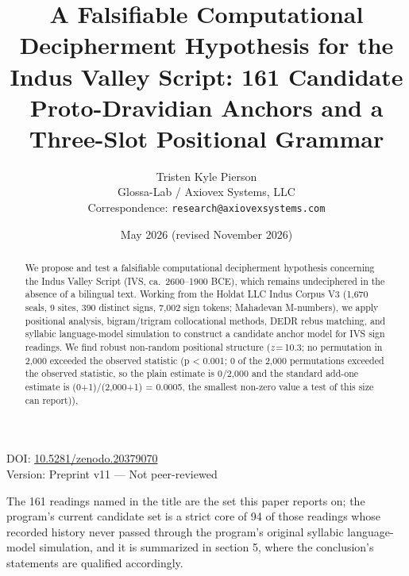 \documentclass[11pt]{article}
\title{A Falsifiable Computational Decipherment Hypothesis for the Indus Valley Script: 161 Candidate Proto-Dravidian Anchors and a Three-Slot Positional Grammar}
\author{Tristen Kyle Pierson\\
Glossa-Lab / Axiovex Systems, LLC\\
Correspondence: \texttt{research@axiovexsystems.com}}
\date{May 2026 (revised November 2026)}
\begin{document}
\maketitle

DOI: \href{https://doi.org/10.5281/zenodo.20379070}{10.5281/zenodo.20379070}\\
Version: Preprint v11 --- Not peer-reviewed

The 161 readings named in the title are the set this paper reports on; the program's current candidate set is a strict core of 94 of those readings whose recorded history never passed through the program's original syllabic language-model simulation, and it is summarized in section 5, where the conclusion's statements are qualified accordingly.

\begin{abstract}
We propose and test a falsifiable computational decipherment hypothesis
concerning the Indus Valley Script (IVS, ca.~2600--1900 BCE), which
remains undeciphered in the absence of a bilingual text. Working from the
Holdat LLC Indus Corpus V3 (1,670 seals, 9 sites, 390 distinct signs,
7,002 sign tokens; Mahadevan M-numbers), we apply positional analysis,
bigram/trigram collocational methods, DEDR rebus matching, and syllabic
language-model simulation to construct a candidate anchor model for IVS
sign readings. We find robust non-random positional structure
(\textit{z}\,=\,10.3; no permutation in 2,000 exceeded the observed statistic (p \textless{} 0.001; 0 of the 2,000 permutations exceeded the observed statistic, so the plain estimate is 0/2,000 and the standard add-one estimate is (0+1)/(2,000+1) = 0.0005, the smallest non-zero value a test of this size can report)),

\end{abstract}
\end{document}
